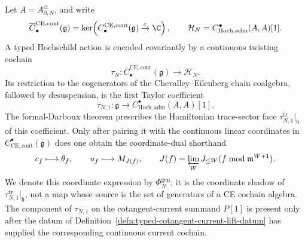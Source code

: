\begin{defn}
\label{defn:typed-hochschild-centre-lift-datum}
Let \(A=A^{\mathrm{cl}}_{\partial,N}\), and write
\[
  \overline C^{\mathrm{CE},\mathrm{cont}}_\bullet(\mathfrak g)
  =
  \ker\!\left(
  C^{\mathrm{CE},\mathrm{cont}}_\bullet(\mathfrak g)
  \xrightarrow{\varepsilon}\C\right),
  \qquad
  \mathcal H_N=
  C^\bullet_{\mathrm{Hoch},\mathrm{adm}}(A,A)[1].
\]
A typed Hochschild action is encoded covariantly by a continuous
twisting cochain
\[
  \tau_N\colon
  \overline C^{\mathrm{CE},\mathrm{cont}}_\bullet(\mathfrak g)
  \longrightarrow \mathcal H_N .
\]
Its restriction to the cogenerators of the Chevalley--Eilenberg chain
coalgebra, followed by desuspension, is the first Taylor coefficient
\begin{equation}\label{eq:typed-centre-first-taylor}
  \tau_{N,1}\colon
  \mathfrak g\longrightarrow
  C^\bullet_{\mathrm{Hoch},\mathrm{adm}}(A,A)[1].
\end{equation}
The formal-Darboux theorem prescribes the Hamiltonian trace-sector face
\(\tau_{N,1}^{\mathrm{tr}}|_{\mathfrak h}\) of this coefficient.  Only
after pairing it
with the continuous linear coordinates in
\(C^\bullet_{\mathrm{CE},\mathrm{cont}}(\mathfrak g)\) does one obtain
the coordinate-dual shorthand
\[
  c_f\longmapsto\theta_f,\qquad
  u_f\longmapsto M_{J(f)},\qquad
  J(f)=\varprojlim_WJ_{\leq W}(f\bmod\mathfrak m^{W+1}).
\]
We denote this coordinate expression by \(\Phi_N^{\mathrm{gen}}\); it
is the coordinate shadow of
\(\tau_{N,1}^{\mathrm{tr}}|_{\mathfrak h}\), not a map
whose source is the set of generators of a CE cochain algebra.  The
component of \(\tau_{N,1}\) on the cotangent-current summand \(P[1]\)
is present only after the datum of
Definition~\ref{defn:typed-cotangent-current-lift-datum} has supplied
the corresponding continuous current cochain.


\end{defn}
